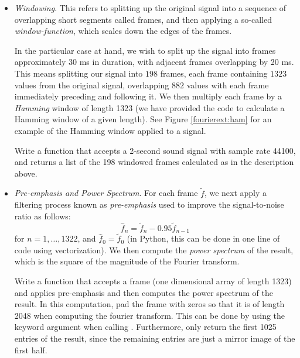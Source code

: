 \begin{itemize}
\item \emph{Windowing}. This refers to splitting up the original signal into a sequence of overlapping
short segments called frames, and then applying a so-called \emph{window-function}, which scales down
the edges of the frames.

In the particular case at hand, we wish to split up the signal into frames approximately 30 ms in
duration, with adjacent frames overlapping by 20 ms. This means splitting our signal into $198$ frames,
each frame containing $1323$ values from the original signal, overlapping $882$ values with each frame
immediately preceding and following it. We then multiply each frame by a \emph{Hamming} window of length
1323 (we have provided the code to calculate a Hamming window of a given length). See Figure
\ref{fourierext:ham} for an example of the Hamming window applied to a signal.

\begin{problem}
Write a function  that accepts a 2-second sound signal with sample rate 44100, and
returns a list of the 198 windowed frames calculated as in the description above.
\end{problem}

\item \emph{Pre-emphasis and Power Spectrum}. For each frame $\tilde{f}$, we next apply
a filtering process known as \emph{pre-emphasis} used to improve the signal-to-noise ratio as follows:
\begin{equation*}
\widehat{f}_{n} = \tilde{f}_{n} - 0.95 \tilde{f}_{n-1}
\end{equation*}
for $n = 1,\ldots,1322$, and $\widehat{f}_0 = \tilde{f}_0$ (in Python, this can be done in one line of code using vectorization).
We then compute the \emph{power spectrum} of the result, which is the square of the magnitude of the
Fourier transform.

\begin{problem}
Write a function  that accepts a frame (one dimensional array of length 1323) and
applies pre-emphasis and then computes the power spectrum of the result. In this computation,
pad the frame with zeros so that it is of length 2048 when computing the fourier transform. This
can be done by using the keyword argument  when calling
. Furthermore, only return the first 1025 entries of the result,
since the remaining entries are just a mirror image of the first half.
\end{problem}


\end{itemize}
